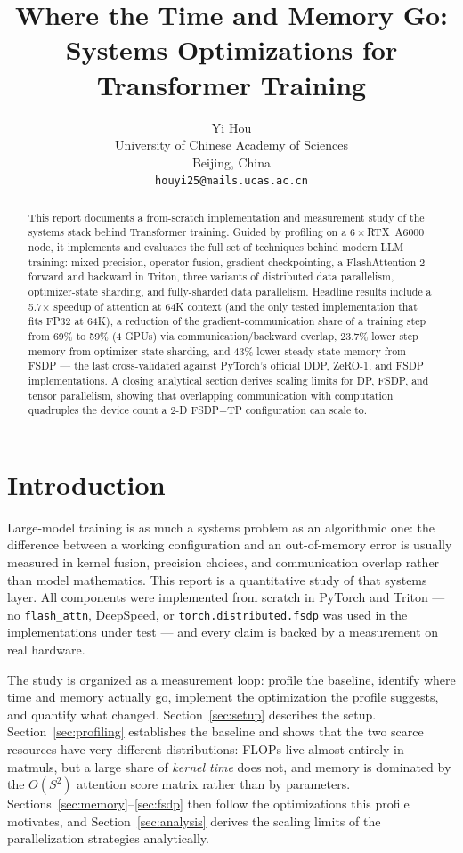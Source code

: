\documentclass{article}
\title{Where the Time and Memory Go:\\ Systems Optimizations for Transformer Training}
\author{%
  Yi Hou \\
  University of Chinese Academy of Sciences\\
  Beijing, China \\
  \texttt{houyi25@mails.ucas.ac.cn}
}
\begin{document}
\maketitle

\begin{abstract}
This report documents a from-scratch implementation and measurement study of the systems stack behind Transformer training. Guided by profiling on a $6\times$RTX~A6000 node, it implements and evaluates the full set of techniques behind modern LLM training: mixed precision, operator fusion, gradient checkpointing, a FlashAttention-2 forward and backward in Triton, three variants of distributed data parallelism, optimizer-state sharding, and fully-sharded data parallelism. Headline results include a 5.7$\times$ speedup of attention at 64K context (and the only tested implementation that fits FP32 at 64K), a reduction of the gradient-communication share of a training step from 69\% to 59\% (4 GPUs) via communication/backward overlap, 23.7\% lower step memory from optimizer-state sharding, and 43\% lower steady-state memory from FSDP --- the last cross-validated against PyTorch's official DDP, ZeRO-1, and FSDP implementations. A closing analytical section derives scaling limits for DP, FSDP, and tensor parallelism, showing that overlapping communication with computation quadruples the device count a 2-D FSDP+TP configuration can scale to.
\end{abstract}

\section{Introduction}

Large-model training is as much a systems problem as an algorithmic one: the difference between a working configuration and an out-of-memory error is usually measured in kernel fusion, precision choices, and communication overlap rather than model mathematics. This report is a quantitative study of that systems layer. All components were implemented from scratch in PyTorch and Triton --- no \texttt{flash\_attn}, DeepSpeed, or \texttt{torch.distributed.fsdp} was used in the implementations under test --- and every claim is backed by a measurement on real hardware.

The study is organized as a measurement loop: profile the baseline, identify where time and memory actually go, implement the optimization the profile suggests, and quantify what changed. Section~\ref{sec:setup} describes the setup. Section~\ref{sec:profiling} establishes the baseline and shows that the two scarce resources have very different distributions: FLOPs live almost entirely in matmuls, but a large share of \emph{kernel time} does not, and memory is dominated by the $O(S^2)$ attention score matrix rather than by parameters. Sections~\ref{sec:memory}--\ref{sec:fsdp} then follow the optimizations this profile motivates, and Section~\ref{sec:analysis} derives the scaling limits of the parallelization strategies analytically.
\end{document}
